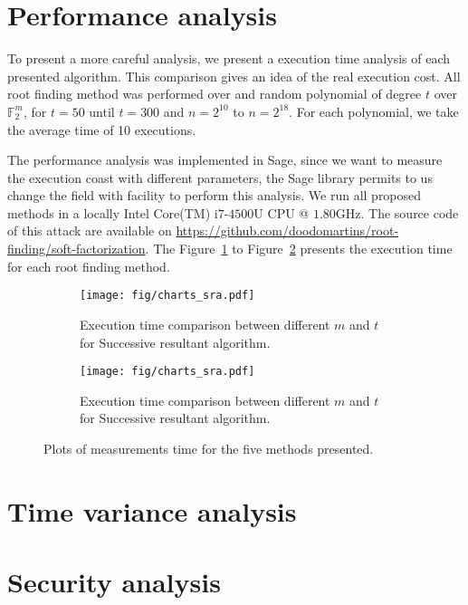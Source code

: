 \section{Performance analysis}
To present a more careful analysis, we present a execution time analysis of each presented algorithm. This comparison gives an idea of the real execution cost. All root finding method was performed over and random polynomial of degree $t$ over $\mathbb{F}_2^m$, for $t = 50$ until $t = 300$ and $n = 2^10$ to $n = 2^{18}$. For each polynomial, we take the average time of 10 executions.
 
The performance analysis was implemented in Sage\cite{sage}, since we want to measure the execution coast with different parameters, the Sage library permits to us change the field with facility to perform this analysis. We run all proposed methods in a locally Intel\textsuperscript{\tiny\textregistered} Core(TM) i$7$-$4500$U CPU @ $1.80$GHz. The source code of this attack are available on \url{https://github.com/doodomartins/root-finding/soft-factorization}. The Figure~\ref{fig:time-SRA} to Figure~\ref{fig:time-EXHA} presents the execution time for each root finding method.


\begin{figure}[!ht]
\centering
\begin{subfigure}{0.48\textwidth}
  \centering
  \texttt{[image: fig/charts\_sra.pdf]}
  \caption{Execution time comparison between different $m$ and $t$ for Successive resultant algorithm.}
  \label{fig:time-SRA}
\end{subfigure}
\begin{subfigure}{0.48\textwidth}
  \centering
  \texttt{[image: fig/charts\_sra.pdf]}
  \caption{Execution time comparison between different $m$ and $t$ for Successive resultant algorithm.}
  \label{fig:time-EXHA}
\end{subfigure}

\caption{Plots of measurements time for the five methods presented.}
\label{fig:graph}
\end{figure}



\section{Time variance analysis}
\section{Security analysis}